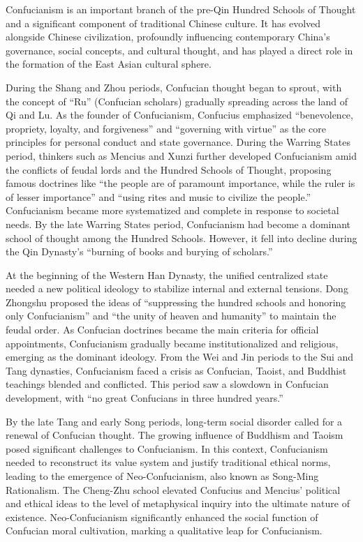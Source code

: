 \documentclass[
]{book}
\begin{document}
Confucianism is an important branch of the pre-Qin Hundred Schools of Thought and a significant component of traditional Chinese culture. It has evolved alongside Chinese civilization, profoundly influencing contemporary China's governance, social concepts, and cultural thought, and has played a direct role in the formation of the East Asian cultural sphere.

During the Shang and Zhou periods, Confucian thought began to sprout, with the concept of ``Ru'' (Confucian scholars) gradually spreading across the land of Qi and Lu. As the founder of Confucianism, Confucius emphasized ``benevolence, propriety, loyalty, and forgiveness'' and ``governing with virtue'' as the core principles for personal conduct and state governance. During the Warring States period, thinkers such as Mencius and Xunzi further developed Confucianism amid the conflicts of feudal lords and the Hundred Schools of Thought, proposing famous doctrines like ``the people are of paramount importance, while the ruler is of lesser importance'' and ``using rites and music to civilize the people.'' Confucianism became more systematized and complete in response to societal needs. By the late Warring States period, Confucianism had become a dominant school of thought among the Hundred Schools. However, it fell into decline during the Qin Dynasty's ``burning of books and burying of scholars.''

At the beginning of the Western Han Dynasty, the unified centralized state needed a new political ideology to stabilize internal and external tensions. Dong Zhongshu proposed the ideas of ``suppressing the hundred schools and honoring only Confucianism'' and ``the unity of heaven and humanity'' to maintain the feudal order. As Confucian doctrines became the main criteria for official appointments, Confucianism gradually became institutionalized and religious, emerging as the dominant ideology. From the Wei and Jin periods to the Sui and Tang dynasties, Confucianism faced a crisis as Confucian, Taoist, and Buddhist teachings blended and conflicted. This period saw a slowdown in Confucian development, with ``no great Confucians in three hundred years.''

By the late Tang and early Song periods, long-term social disorder called for a renewal of Confucian thought. The growing influence of Buddhism and Taoism posed significant challenges to Confucianism. In this context, Confucianism needed to reconstruct its value system and justify traditional ethical norms, leading to the emergence of Neo-Confucianism, also known as Song-Ming Rationalism. The Cheng-Zhu school elevated Confucius and Mencius' political and ethical ideas to the level of metaphysical inquiry into the ultimate nature of existence. Neo-Confucianism significantly enhanced the social function of Confucian moral cultivation, marking a qualitative leap for Confucianism.
\end{document}
